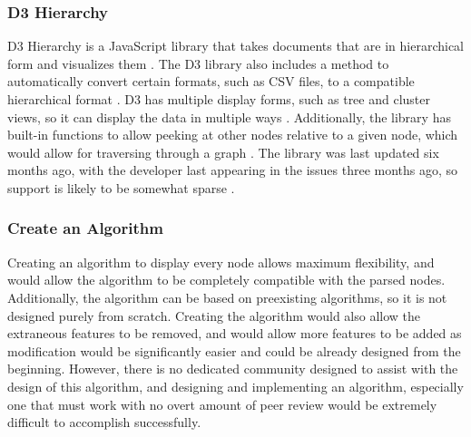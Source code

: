\documentclass[onecolumn, draftclsnofoot,10pt, compsoc]{IEEEtran}
\begin{document}
\subsubsection{D3 Hierarchy}
D3 Hierarchy is a JavaScript library that takes documents that are in hierarchical form and visualizes them \cite{7}. The D3 library also includes a method to automatically convert certain formats, such as CSV files, to a compatible hierarchical format \cite{7}. D3 has multiple display forms, such as tree and cluster views, so it can display the data in multiple ways \cite{7}. Additionally, the library has built-in functions to allow peeking at other nodes relative to a given node, which would allow for traversing through a graph  \cite{7}. The library was last updated six months ago, with the developer last appearing in the issues three months ago, so support is likely to be somewhat sparse \cite{7}.


\subsubsection{Create an Algorithm}
Creating an algorithm to display every node allows maximum flexibility, and would allow the algorithm to be completely compatible with the parsed nodes. Additionally, the algorithm can be based on preexisting algorithms, so it is not designed purely from scratch. Creating the algorithm would also allow the extraneous features to be removed, and would allow more features to be added as modification would be significantly easier and could be already designed from the beginning. However, there is no dedicated community designed to assist with the design of this algorithm, and designing and implementing an algorithm, especially one that must work with no overt amount of peer review would be extremely difficult to accomplish successfully.
\end{document}
